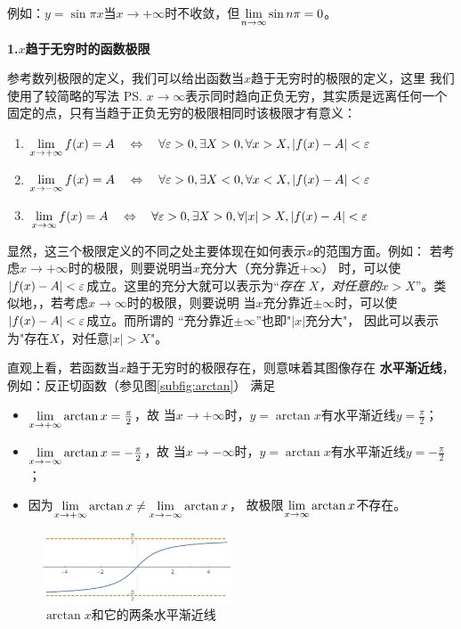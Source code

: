 例如：$y=\sin\pi x$当$x\to+\infty$时不收敛，但$\lim\limits_{n\to\infty}\sin n\pi=0$。
\fi

\bs
{\bf 1.\;$x$趋于无穷时的函数极限}

参考数列极限的定义，我们可以给出函数当$x$趋于无穷时的极限的定义，这里
我们使用了较简略的写法
\ps{$x\to\infty$表示同时趋向正负无穷，其实质是远离任何一个
固定的点，只有当趋于正负无穷的极限相同时该极限才有意义}：
\begin{thx}
	\begin{enumerate}%
	  \item $\lim\limits_{x\to{+\infty}}f(x)=A\quad\Leftrightarrow\quad
	  \forall \varepsilon>0,\exists X>0,\forall x>X,|f(x)-A|<\varepsilon$
	  \item $\lim\limits_{x\to{-\infty}}f(x)=A\quad\Leftrightarrow\quad
	  \forall \varepsilon>0,\exists X<0,\forall x<X,|f(x)-A|<\varepsilon$
	  \item $\limx{\infty}f(x)=A\quad\Leftrightarrow\quad
	  \forall \e>0,\exists X>0,\forall |x|>X,|f(x)-A|<\e$
	\end{enumerate}
\end{thx}

显然，这三个极限定义的不同之处主要体现在如何表示$x$的范围方面。例如：
若考虑$x\to+\infty$时的极限，则要说明当$x$充分大（充分靠近$+\infty$）
时，可以使$|f(x)-A|<\varepsilon$成立。这里的充分大就可以表示为“{\it 存在
$X$，对任意的$x>X$}”。类似地，，若考虑$x\to\infty$时的极限，则要说明
当$x$充分靠近$\pm\infty$时，可以使$|f(x)-A|<\varepsilon$成立。而所谓的
“{\kaishu 充分靠近$\pm\infty$}”{\kaishu 也即"$|x|$充分大}"，
因此可以表示为"存在$X$，对任意$|x|>X$"。

\bs
直观上看，若函数当$x$趋于无穷时的极限存在，则意味着其图像存在
{\bf 水平渐近线}，例如：反正切函数（参见图\ref{subfig:arctan}）
满足
\begin{itemize}
	\item $\lim\limits_{x\to{+\infty}}\arctan x=\frac{\pi}{2}$，故
	当$x\to+\infty$时，$y=\arctan x$有水平渐近线$y=\frac{\pi}{2}$；
	\item $\lim\limits_{x\to{-\infty}}\arctan x=-\frac{\pi}{2}$，故
	当$x\to-\infty$时，$y=\arctan x$有水平渐近线$y=-\frac{\pi}{2}$；
	\item 因为$\lim\limits_{x\to{+\infty}}\arctan x\ne\lim\limits_{x\to{-\infty}}\arctan x$，
	故极限$\lim\limits_{x\to{\infty}}\arctan x$不存在。
\end{itemize}

\begin{figure}[h]
	\centering
	\includegraphics[width=0.5\textwidth]{./Images/Ch01/arcTanAsy.pdf}
	\caption{$\arctan x$和它的两条水平渐近线}
	\label{fig:arctanAsy}
\end{figure}
	
